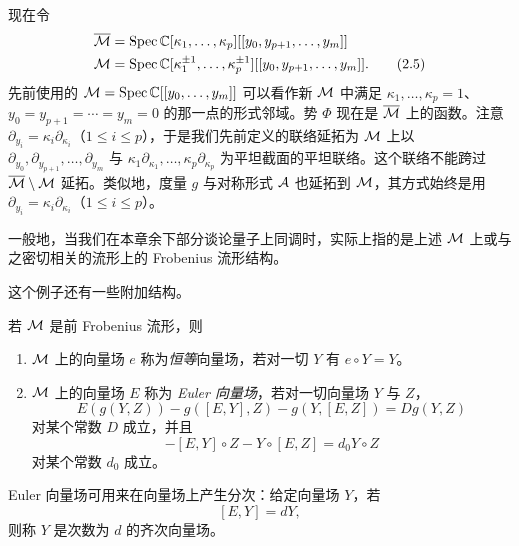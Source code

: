 现在令
\begin{align}
\overline{\mathcal{M}}&=\operatorname{Spec}\mathbb{C}[\kappa_1,\dots,\kappa_p][[y_0,y_{p+1},\dots,y_m]]\notag\\
\mathcal{M}&=\operatorname{Spec}\mathbb{C}[\kappa_1^{\pm 1},\dots,\kappa_p^{\pm 1}][[y_0,y_{p+1},\dots,y_m]]. \tag{2.5}
\end{align}
先前使用的 $\mathcal{M}=\operatorname{Spec}\mathbb{C}[[y_0,\dots,y_m]]$ 可以看作新 $\mathcal{M}$ 中满足 $\kappa_1,\dots,\kappa_p=1$、$y_0=y_{p+1}=\cdots=y_m=0$ 的那一点的形式邻域。势 $\Phi$ 现在是 $\overline{\mathcal{M}}$ 上的函数。注意 $\partial_{y_i}=\kappa_i\partial_{\kappa_i}$（$1\le i\le p$），于是我们先前定义的联络延拓为 $\mathcal{M}$ 上以 $\partial_{y_0},\partial_{y_{p+1}},\dots,\partial_{y_m}$ 与 $\kappa_1\partial_{\kappa_1},\dots,\kappa_p\partial_{\kappa_p}$ 为平坦截面的平坦联络。这个联络不能跨过 $\overline{\mathcal{M}}\setminus\mathcal{M}$ 延拓。类似地，度量 $g$ 与对称形式 $\mathcal{A}$ 也延拓到 $\mathcal{M}$，其方式始终是用 $\partial_{y_i}=\kappa_i\partial_{\kappa_i}$（$1\le i\le p$）。

一般地，当我们在本章余下部分谈论量子上同调时，实际上指的是上述 $\mathcal{M}$ 上或与之密切相关的流形上的 Frobenius 流形结构。

这个例子还有一些附加结构。

\begin{definition}
若 $\mathcal{M}$ 是前 Frobenius 流形，则
\begin{enumerate}[label=(\arabic*)]
\item $\mathcal{M}$ 上的向量场 $e$ 称为\emph{恒等}向量场，若对一切 $Y$ 有 $e\circ Y=Y$。
\item $\mathcal{M}$ 上的向量场 $E$ 称为 \emph{Euler 向量场}，若对一切向量场 $Y$ 与 $Z$，
\begin{equation}
E(g(Y,Z))-g([E,Y],Z)-g(Y,[E,Z])=Dg(Y,Z) \tag{2.6}
\end{equation}
对某个常数 $D$ 成立，并且
\begin{equation}
[E,Y\circ Z]-[E,Y]\circ Z-Y\circ[E,Z]=d_0Y\circ Z \tag{2.7}
\end{equation}
对某个常数 $d_0$ 成立。
\end{enumerate}
\end{definition}

Euler 向量场可用来在向量场上产生分次：给定向量场 $Y$，若
\[
[E,Y]=dY,
\]
则称 $Y$ 是次数为 $d$ 的齐次向量场。

